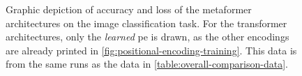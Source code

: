 \begin{figure}[p]
    \centering
    \vspace{-1cm}
    \caption{Graphic depiction of accuracy and loss of the metaformer architectures on the image classification task. 
            For the transformer architectures, only the \emph{learned} pe is drawn, as the other encodings are already printed in \autoref{fig:positional-encoding-training}. 
            This data is from the same runs as the data in \autoref{table:overall-comparison-data}.
    }
    \label{fig:overall-comparison-data}
\end{figure}
